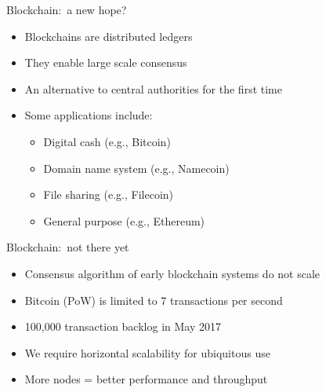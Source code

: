\documentclass{beamer}
\begin{document}
\begin{frame}{Blockchain:~a new hope?}
  \begin{itemize}
    \item Blockchains are distributed ledgers
    \item They enable large scale consensus
    \item An alternative to central authorities for the first time
    \item Some applications include:
    \begin{itemize}
      \item Digital cash (e.g., Bitcoin)
      \item Domain name system (e.g., Namecoin)
      \item File sharing (e.g., Filecoin)
      \item General purpose (e.g., Ethereum)
    \end{itemize}
  \end{itemize}
\end{frame}

\begin{frame}{Blockchain:~not there yet}
  \begin{itemize}
    \item Consensus algorithm of early blockchain systems do not scale
    \item Bitcoin (PoW) is limited to 7 transactions per second
    \item 100,000 transaction backlog in May 2017
    \item We require horizontal scalability for ubiquitous use
    \item More nodes = better performance and throughput
  \end{itemize}
\end{frame}
\end{document}
